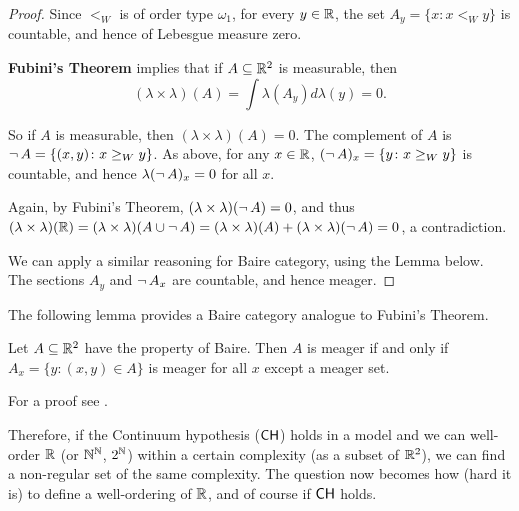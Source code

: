 \begin{proof}Since $<_W$ is of order type $\omega_1$, for every $y \in \mathbb{R}$, the set $A_y = \{x \colon x <_W y \}$ is countable, and hence of Lebesgue measure zero.

\textbf{Fubini's Theorem} implies that if $A \subseteq \mathbb{R}^2$ is measurable, then
\begin{equation*}
(\lambda\times\lambda) (A) = \int \lambda(A_y) d\lambda(y) = 0.
\end{equation*}

So if $A$ is measurable, then $(\lambda\times\lambda) (A) = 0$. The complement of $A$ is $\neg \, A = \{(x,y) \colon x \geq_W y \}$. As above, for any $x \in \mathbb{R}$, $(\neg \, A)_x = \{y \colon x \geq_W y \}$ is countable, and hence $\lambda(\neg \, A)_x = 0$ for all $x$.

Again, by Fubini's Theorem, $(\lambda\times\lambda) (\neg \, A) = 0$, and thus $(\lambda\times\lambda) (\mathbb{R})  = (\lambda\times\lambda) (A \cup \neg \, A) = (\lambda\times\lambda) (A) + (\lambda\times\lambda) (\neg \, A) = 0$, a contradiction.

We can apply a similar reasoning for Baire category, using the Lemma below. The sections $A_y$ and $\neg \, A_x$ are countable, and hence meager.

\end{proof}The following lemma provides a Baire category analogue to Fubini's Theorem.

\begin{lemma}\label{lem-fubini-category}Let $A \subseteq \mathbb{R}^2$ have the property of Baire. Then $A$ is meager if and only if $A_x = \{y \colon (x,y) \in A\}$ is meager for all $x$ except a meager set.

\end{lemma}For a proof see \cite{Kechris:1995a}.

Therefore, if the Continuum hypothesis ($\mathsf{CH}$) holds in a model and we can well-order $\mathbb{R}$ (or $\mathbb{N}^{\mathbb{N}}$, $2^{\mathbb{N}}$) within a certain complexity (as a subset of $\mathbb{R}^2$), we can find a non-regular set of the same complexity. The question now becomes how (hard it is) to define a well-ordering of $\mathbb{R}$, and of course if $\mathsf{CH}$ holds.
